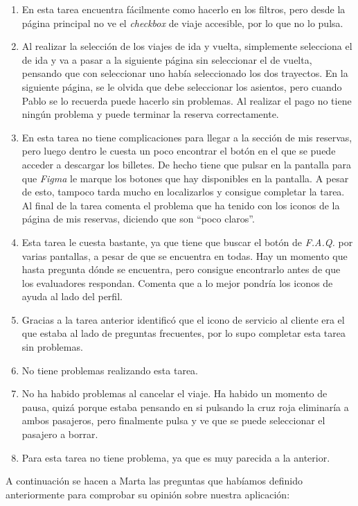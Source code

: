 \begin{enumerate}
    \item En esta tarea encuentra fácilmente como hacerlo en los filtros, pero desde la página principal no ve el \textit{checkbox} de viaje
        accesible, por lo que no lo pulsa.
    \item Al realizar la selección de los viajes de ida y vuelta, simplemente selecciona el de ida y va a pasar a la siguiente página sin seleccionar
        el de vuelta, pensando que con seleccionar uno había seleccionado los dos trayectos. En la siguiente página, se le olvida que debe seleccionar
        los asientos, pero cuando Pablo se lo recuerda puede hacerlo sin problemas. Al realizar el pago no tiene ningún problema y puede terminar
        la reserva correctamente.
    \item En esta tarea no tiene complicaciones para llegar a la sección de mis reservas, pero luego dentro le cuesta un poco encontrar el botón en el que
        se puede acceder a descargar los billetes. De hecho tiene que pulsar en la pantalla para que \textit{Figma} le marque los botones que hay disponibles
        en la pantalla. A pesar de esto, tampoco tarda mucho en localizarlos y consigue completar la tarea. Al final de la tarea comenta el problema que ha tenido
        con los iconos de la página de mis reservas, diciendo que son ``poco claros''.
    \item Esta tarea le cuesta bastante, ya que tiene que buscar el botón de \textit{F.A.Q.} por varias pantallas, a pesar de que se
        encuentra en todas. Hay un momento que hasta pregunta dónde se encuentra, pero consigue encontrarlo antes de que los evaluadores
        respondan. Comenta que a lo mejor pondría los iconos de ayuda al lado del perfil.
    \item Gracias a la tarea anterior identificó que el icono de servicio al cliente era el que estaba al lado de preguntas frecuentes, por lo
        supo completar esta tarea sin problemas.
    \item No tiene problemas realizando esta tarea.
    \item No ha habido problemas al cancelar el viaje. Ha habido un momento de pausa, quizá porque estaba pensando en si pulsando la cruz roja eliminaría
        a ambos pasajeros, pero finalmente pulsa y ve que se puede seleccionar el pasajero a borrar.
    \item Para esta tarea no tiene problema, ya que es muy parecida a la anterior.
\end{enumerate}

A continuación se hacen a Marta las preguntas que habíamos definido anteriormente para comprobar su opinión sobre nuestra aplicación:

